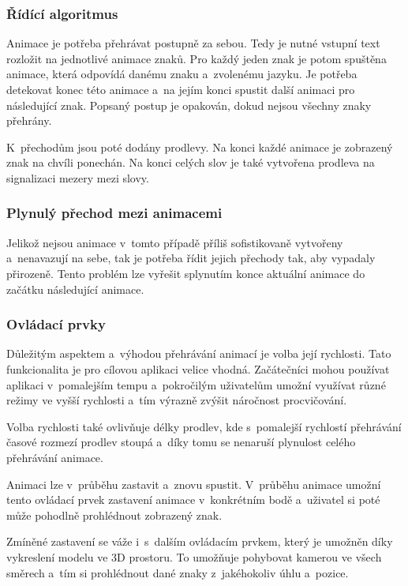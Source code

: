 \documentclass[
  master,
  program=ainfvs,
  biblatex,
  figures=true,
  tables=false,
  sourcecodes=true,
  glossaries,
  index
]{kidiplom}
\begin{document}
        \subsubsection{Řídící algoritmus}
            Animace je potřeba přehrávat postupně za sebou. Tedy je nutné vstupní text rozložit na jednotlivé animace znaků. Pro každý jeden znak je potom spuštěna animace, která odpovídá danému znaku a~zvolenému jazyku. Je potřeba detekovat konec této animace a~na jejím konci spustit další animaci pro následující znak. Popsaný postup je opakován, dokud nejsou všechny znaky přehrány.

           K~přechodům jsou poté dodány prodlevy. Na konci každé animace je zobrazený znak na chvíli ponechán. Na konci celých slov je také vytvořena prodleva na signalizaci mezery mezi slovy.
        
        \subsubsection{Plynulý přechod mezi animacemi}
            Jelikož nejsou animace v~tomto případě příliš sofistikovaně vytvořeny a~nenavazují na sebe, tak je potřeba řídit jejich přechody tak, aby vypadaly přirozeně. Tento problém lze vyřešit splynutím konce aktuální animace do začátku následující animace.

        \subsubsection{Ovládací prvky}
            Důležitým aspektem a~výhodou přehrávání animací je volba její rychlosti. Tato funkcionalita je pro cílovou aplikaci velice vhodná. Začátečníci mohou používat aplikaci v~pomalejším tempu a~pokročilým uživatelům umožní využívat různé režimy ve vyšší rychlosti a~tím výrazně zvýšit náročnost procvičování. 
            
            Volba rychlosti také ovlivňuje délky prodlev, kde s~pomalejší rychlostí přehrávání časové rozmezí prodlev stoupá a~díky tomu se nenaruší plynulost celého přehrávání animace.

            Animaci lze v~průběhu zastavit a~znovu spustit. V~průběhu animace umožní tento ovládací prvek zastavení animace v~konkrétním bodě a~uživatel si poté může pohodlně prohlédnout zobrazený znak.

            Zmíněné zastavení se váže i~s~dalším ovládacím prvkem, který je umožněn díky vykreslení modelu ve 3D prostoru. To umožňuje pohybovat kamerou ve všech směrech a~tím si prohlédnout dané znaky z~jakéhokoliv úhlu a~pozice.
\end{document}
